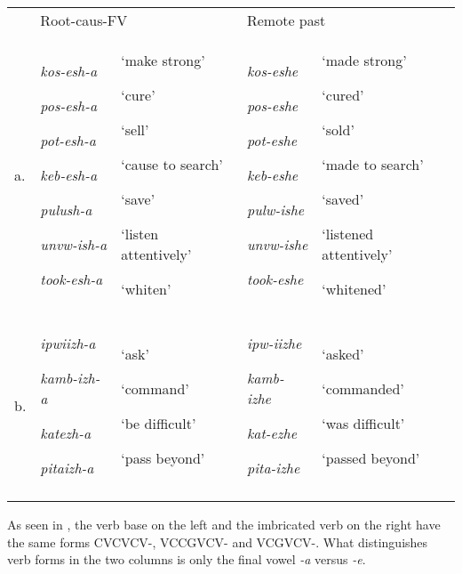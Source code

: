\documentclass[output=paper]{langsci/langscibook}
\begin{document}
\begin{tabularx}{\textwidth}{XXXXX} & \multicolumn{2}{l}{Root-caus-FV} & \multicolumn{2}{l}{Remote past}\\
\lsptoprule
a. & {\emph{kos-esh-a}}

{\emph{pos-esh-a}}

{\emph{pot-esh-a}}

{\emph{keb-esh-a}}

{\emph{pulush-a}}

{\emph{unvw-ish-a}}

\emph{took-esh-a} & {‘make strong’}

{‘cure’}

{‘sell’}

{‘cause to search’}

{‘save’}

{‘listen attentively’}

‘whiten’ & {\emph{kos-eshe}}

{\emph{pos-eshe}}

{\emph{pot-eshe}}

{\emph{keb-eshe}}

{\emph{pulw-ishe}}

{\emph{unvw-ishe}}

\emph{took-eshe} & {‘made strong’}

{‘cured’}

{‘sold’}

{‘made to search’}

{‘saved’}

{‘listened attentively’}

‘whitened’\\
b. & {\emph{ipwiizh-a}}

{\emph{kamb-izh-a}}

{\emph{katezh-a}}

\emph{pitaizh-a} & {‘ask’}

{‘command’}

{‘be difficult’}

‘pass beyond’ & {\emph{ipw-iizhe}}

{\emph{kamb-izhe}}

{\emph{kat-ezhe}}

\emph{pita-izhe} & {‘asked’}

{‘commanded’}

{‘was difficult’}

‘passed beyond’\\
\lspbottomrule
\end{tabularx}
As seen in , the verb base on the left and the imbricated verb on the right have the same forms CVCVCV-, VCCGVCV- and VCGVCV-. What distinguishes verb forms in the two columns is only the final vowel \emph{{}-a} versus \emph{{}-e}.
\end{document}
